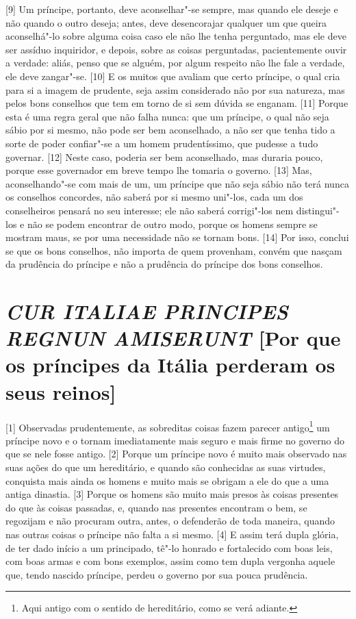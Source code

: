{[}9{]} Um príncipe, portanto, deve aconselhar"-se sempre, mas quando ele
deseje e não quando o outro deseja; antes, deve desencorajar qualquer um
que queira aconselhá"-lo sobre alguma coisa caso ele não lhe tenha
perguntado, mas ele deve ser assíduo inquiridor, e depois, sobre as
coisas perguntadas, pacientemente ouvir a verdade: aliás, penso que se
alguém, por algum respeito não lhe fale a verdade, ele deve zangar"-se.
{[}10{]} E os muitos que avaliam que certo príncipe, o qual cria para si
a imagem de prudente, seja assim considerado não por sua natureza, mas
pelos bons conselhos que tem em torno de si sem dúvida se enganam.
{[}11{]} Porque esta é uma regra geral que não falha nunca: que um
príncipe, o qual não seja sábio por si mesmo, não pode ser bem
aconselhado, a não ser que tenha tido a sorte de poder confiar"-se a um
homem prudentíssimo, que pudesse a tudo governar. {[}12{]} Neste caso,
poderia ser bem aconselhado, mas duraria pouco, porque esse governador
em breve tempo lhe tomaria o governo. {[}13{]} Mas, aconselhando"-se com
mais de um, um príncipe que não seja sábio não terá nunca os conselhos
concordes, não saberá por si mesmo uni"-los, cada um dos conselheiros
pensará no seu interesse; ele não saberá corrigi"-los nem distingui"-los e
não se podem encontrar de outro modo, porque os homens sempre se mostram
maus, se por uma necessidade não se tornam bons. {[}14{]} Por isso,
conclui se que os bons conselhos, não importa de quem provenham, convém
que nasçam da prudência do príncipe e não a prudência do príncipe dos
bons conselhos.

\quebra\section{\emph{CUR ITALIAE PRINCIPES REGNUN AMISERUNT}
{[}Por que os príncipes da Itália perderam os seus reinos{]}}

{[}1{]} Observadas prudentemente, as sobreditas coisas fazem parecer
antigo\footnote{Aqui antigo com o sentido de hereditário, como se verá
  adiante.} um príncipe novo e o tornam imediatamente mais seguro e mais
firme no governo do que se nele fosse antigo. {[}2{]} Porque um príncipe
novo é muito mais observado nas suas ações do que um hereditário, e
quando são conhecidas as suas virtudes, conquista mais ainda os homens e
muito mais se obrigam a ele do que a uma antiga dinastia. {[}3{]} Porque
os homens são muito mais presos às coisas presentes do que às coisas
passadas, e, quando nas presentes encontram o bem, se regozijam e não
procuram outra, antes, o defenderão de toda maneira, quando nas outras
coisas o príncipe não falta a si mesmo. {[}4{]} E assim terá dupla
glória, de ter dado início a um principado, tê"-lo honrado e fortalecido
com boas leis, com boas armas e com bons exemplos, assim como tem dupla
vergonha aquele que, tendo nascido príncipe, perdeu o governo por sua
pouca prudência.

